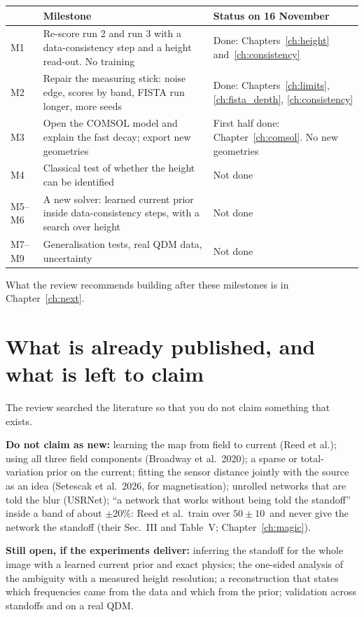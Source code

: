 \begin{center}
\small
\begin{tabularx}{\textwidth}{l>{\raggedright\arraybackslash}X>{\raggedright\arraybackslash}p{4.2cm}}
\toprule
 & Milestone & Status on 16 November \\
\midrule
M1 & Re-score run 2 and run 3 with a data-consistency step and a height read-out. No training & Done:
Chapters~\ref{ch:height} and~\ref{ch:consistency} \\
M2 & Repair the measuring stick: noise edge, scores by band, FISTA run longer, more seeds & Done:
Chapters~\ref{ch:limits}, \ref{ch:fista_depth}, \ref{ch:consistency} \\
M3 & Open the COMSOL model and explain the fast decay; export new geometries & First half done:
Chapter~\ref{ch:comsol}. No new geometries \\
M4 & Classical test of whether the height can be identified & Not done \\
M5--M6 & A new solver: learned current prior inside data-consistency steps, with a search over height & Not done \\
M7--M9 & Generalisation tests, real QDM data, uncertainty & Not done \\
\bottomrule
\end{tabularx}
\end{center}

What the review recommends building after these milestones is in Chapter~\ref{ch:next}.

\section{What is already published, and what is left to claim}

The review searched the literature so that you do not claim something that exists.

\textbf{Do not claim as new:} learning the map from field to current (Reed et al.); using all three field components
(Broadway et al.\ 2020); a sparse or total-variation prior on the current; fitting the sensor distance jointly with
the source as an idea (Setescak et al.\ 2026, for magnetisation); unrolled networks that are told the blur (USRNet);
``a network that works without being told the standoff'' inside a band of about $\pm20\%$: Reed et al.\ train over
$50\pm10$\um\ and never give the network the standoff (their Sec.~III and Table~V; Chapter~\ref{ch:magic}).

\textbf{Still open, if the experiments deliver:} inferring the standoff for the whole image with a learned current prior
and exact physics; the one-sided analysis of the ambiguity with a measured height resolution; a reconstruction that
states which frequencies came from the data and which from the prior; validation across standoffs and on a real QDM.

